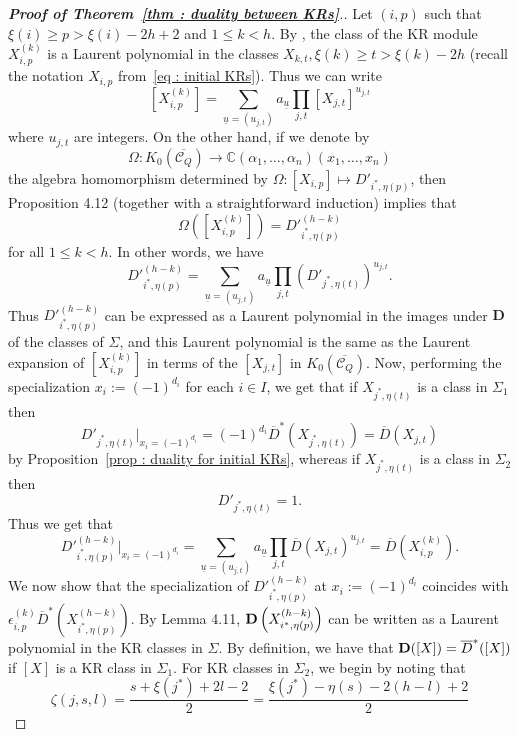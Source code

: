 \documentclass[12pt]{amsart}
\theoremstyle{plain}
\theoremstyle{definition}
\numberwithin{equation}{section}
\newcommand{\barD}{\overline{D}}
\newcommand{\barDstar}{\overline{D}^{*}}
\newcommand{\CQ}{\mathcal{C}_Q}
\newcommand{\barCQ}{\overline{\mathcal{C}_Q}}
\begin{document}
\begin{proof}[ \textbf{Proof of Theorem~\ref{thm : duality between KRs}}.]

Let $(i,p)$ such that $\xi(i) \geq p > \xi(i)-2h+2$ and $1 \leq k<h$. By \cite[Theorem 3.1]{HL16}, the class of the KR module $X_{i,p}^{(k)}$ is a Laurent polynomial in the classes $X_{k,t} , \xi(k) \geq t > \xi(k)-2h$ (recall the notation $X_{i,p}$ from~\eqref{eq : initial KRs}). Thus we can write 
$$ [X_{i,p}^{(k)}] = \sum_{ \underline{u}=(u_{j,t})} a_{\underline{u}} \prod_{j,t} [X_{j,t}]^{u_{j,t}}  $$
where $u_{j,t}$ are integers. On the other hand, if we denote by 
$$\Omega : K_0(\barCQ) \longrightarrow \mathbb{C}(\alpha_1, \ldots , \alpha_n)(x_1, \ldots , x_n) $$
the algebra homomorphism  determined by $\Omega : [X_{i,p}] \longmapsto D'_{i^{*} , \eta(p)}$,
then Proposition 4.12 (together with a straightforward induction) implies that 
$$ \Omega \left( [X_{i,p}^{(k)}] \right) = {D'}_{i^{*} , \eta(p)}^{(h-k)} $$
for all $1 \leq k < h$. In other words, we have 
$$ {D'}_{i^{*} , \eta(p)}^{(h-k)} = \sum_{ \underline{u}=(u_{j,t})} a_{\underline{u}} \prod_{j,t}  \left( {D'}_{j^{*},\eta(t)} \right)^{u_{j,t}}.  $$
 Thus ${D'}_{i^{*} , \eta(p)}^{(h-k)}$ can be expressed as a Laurent polynomial in the images under $\boldsymbol{D}$ of the classes of $\Sigma$, and this Laurent polynomial is the same as the Laurent expansion of $[X_{i,p}^{(k)}]$ in terms of the $[X_{j,t}]$ in $K_0(\overline{\CQ})$. Now, performing the specialization $x_i := (-1)^{d_i}$ for each $i \in I$, we get that if $X_{j^{*}, \eta(t)}$ is a class in $\Sigma_1$ then
 $${D'}_{j^{*},\eta(t)}|_{x_i = (-1)^{d_i}} = (-1)^{d_i}  \barDstar \left({X}_{j^{*},\eta(t)} \right) = \barD \left( X_{j,t} \right)  $$
 by Proposition~\ref{prop : duality for initial KRs}, whereas if $X_{j^{*}, \eta(t)}$ is a class in $\Sigma_2$ then 
 $${D'}_{j^{*},\eta(t)}  = 1 .  $$ 
 Thus we get that 
 $${D'}_{i^{*} , \eta(p)}^{(h-k)}|_{x_i = (-1)^{d_i}} =\sum_{ \underline{u}=(u_{j,t})} a_{\underline{u}} \prod_{j,t} \barD \left( X_{j,t} \right)^{u_{j,t}} = \barD \left( X_{i,p}^{(k)} \right) .  $$
 We now show that the specialization of ${D'}_{i^{*} , \eta(p)}^{(h-k)}$ at $x_i := (-1)^{d_i}$ coincides with $\epsilon_{i,p}^{(k)} \barDstar \left( X_{i^{*} , \eta(p)}^{(h-k)} \right)$.
 By Lemma 4.11, ${\bf D}  \left( X_{i^{*} , \eta(p)}^{(h-k)} \right)$ can be written as a Laurent polynomial in the KR classes in $\Sigma$. By definition, we have that $ {\bf D}([X]) = \barDstar([X])$ if $[X]$ is a KR class in $\Sigma_1$. For KR classes in $\Sigma_2$, we begin by noting that 
 $$ \zeta(j, s,l) = \frac{ s+ \xi(j^{*})+2l-2}{2}  = \frac{\xi(j^{*})-\eta(s)-2(h-l)+2}{2} $$

\end{proof}
\end{document}
